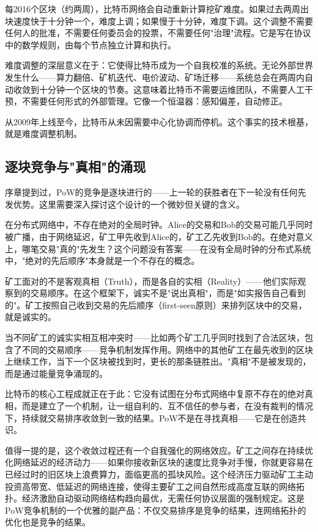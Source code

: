 \documentclass[a4paper,12pt,openany]{ctexbook}
\begin{document}
每2016个区块（约两周），比特币网络会自动重新计算挖矿难度。如果过去两周出块速度快于十分钟一个，难度上调；如果慢于十分钟，难度下调。这个调整不需要任何人的批准，不需要任何委员会的投票，不需要任何"治理"流程。它是写在协议中的数学规则，由每个节点独立计算和执行。

难度调整的深层意义在于：它使得比特币成为一个自我校准的系统。无论外部世界发生什么——算力翻倍、矿机迭代、电价波动、矿场迁移——系统总会在两周内自动收敛到十分钟一个区块的节奏。这意味着比特币不需要运维团队，不需要人工干预，不需要任何形式的外部管理。它像一个恒温器：感知偏差，自动修正。

从2009年上线至今，比特币从未因需要中心化协调而停机。这个事实的技术根基，就是难度调整机制。


\subsection*{逐块竞争与"真相"的涌现}


序章提到过，PoW的竞争是逐块进行的——上一轮的获胜者在下一轮没有任何先发优势。这里需要深入探讨这个设计的一个微妙但关键的含义。

在分布式网络中，不存在绝对的全局时钟。Alice的交易和Bob的交易可能几乎同时被广播，由于网络延迟，矿工甲先收到Alice的，矿工乙先收到Bob的。在绝对意义上，哪笔交易"真的"先发生？这个问题没有答案——在没有全局时钟的分布式系统中，"绝对的先后顺序"本身就是一个不存在的概念。

矿工面对的不是客观真相（Truth），而是各自的实相（Reality）——他们实际观察到的交易顺序。在这个框架下，诚实不是"说出真相"，而是"如实报告自己看到的"。矿工按照自己收到交易的先后顺序（first-seen原则）来排列区块中的交易，就是诚实的。

当不同矿工的诚实实相互相冲突时——比如两个矿工几乎同时找到了合法区块，包含了不同的交易顺序——竞争机制发挥作用。网络中的其他矿工在最先收到的区块上继续工作，当下一个区块被找到时，更长的那条链胜出。"真相"不是被发现的，而是通过能量竞争涌现的。

比特币的核心工程成就正在于此：它没有试图在分布式网络中复原不存在的绝对真相，而是建立了一个机制，让一组自利的、互不信任的参与者，在没有裁判的情况下，持续就交易排序收敛到一致的结果。PoW不是在寻找真相——它是在创造共识。

值得一提的是，这个收敛过程还有一个自我强化的网络效应。矿工之间存在持续优化网络延迟的经济动力——如果你接收新区块的速度比竞争对手慢，你就更容易在已经过时的旧区块上浪费算力，面临更高的孤块风险。这个经济压力驱动矿工主动投资高带宽、低延迟的网络连接，使得主要矿工之间自然形成高度互联的网络拓扑。经济激励自动驱动网络结构趋向最优，无需任何协议层面的强制规定。这是PoW竞争机制的一个优雅的副产品：不仅交易排序是竞争的结果，连网络拓扑的优化也是竞争的结果。
\end{document}
